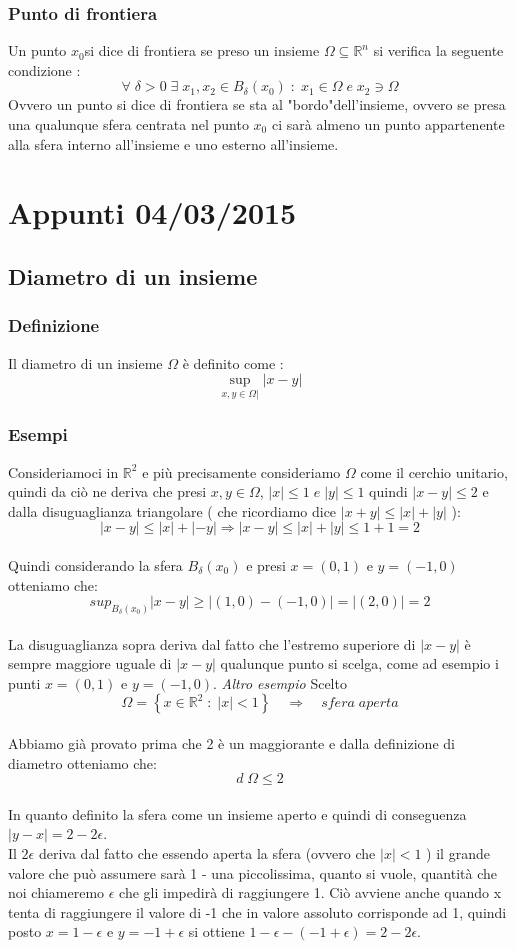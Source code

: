 \documentclass[fontsize = 20px, paper = a4]{article}
\begin{document}
\subsubsection{Punto di frontiera}
Un punto $x_0$si dice di frontiera se preso un insieme $\Omega \subseteq \mathbb{R}^n$ si verifica la seguente condizione : 
$$\forall \; \delta > 0 \; \exists \; x_1,x_2 \in B_\delta (x_0) \; : \; x_1 \in \Omega \; e \; x_2 \ni\Omega $$
Ovvero un punto si dice di frontiera se sta al "bordo"dell'insieme, ovvero se presa una qualunque sfera centrata nel punto $x_0$ ci sarà almeno un punto appartenente alla sfera interno all'insieme e uno esterno all'insieme.
\section{Appunti 04/03/2015}
\subsection{Diametro di un insieme}
\subsubsection{Definizione}
Il diametro di un insieme $\Omega$ è definito come :
$$\sup_{x,y \in \Omega|}|x-y|$$
\subsubsection{Esempi}
Consideriamoci in $\mathbb{R}^2$ e più precisamente consideriamo $\Omega$ come il cerchio unitario, quindi da ciò ne deriva che presi $x,y \in \Omega$, $|x| \le 1 \; e \; |y| \le 1$ quindi $ | x - y | \le 2$ e dalla disuguaglianza triangolare ( che ricordiamo dice $|x+y| \le |x| + |y|$ ): 
$$|x-y| \le |x| + |-y| \Longrightarrow |x-y| \le |x| + |y| \le 1 +1 = 2$$  \\ 
Quindi considerando la sfera $B_\delta(x_0)$ e presi $x = (0,1)$ e $y=(-1,0)$ otteniamo che:
$$sup_{B_\delta(x_0)} |x-y| \ge |(1,0) - (-1,0)| = |(2,0)| = 2$$ \\ 
La disuguaglianza sopra deriva dal fatto che l'estremo superiore di $|x-y|$ è sempre maggiore uguale di $|x-y|$ qualunque punto si scelga, come ad esempio i punti $x = (0,1)$ e $y = (-1,0)$.
\emph{Altro esempio}
Scelto \\
$$\Omega = \left \{ x\in \mathbb{R}^2 \; : \; |x| < 1 \right \} \quad \Longrightarrow \quad sfera \; aperta $$ \\
Abbiamo già provato prima che 2 è un maggiorante e dalla definizione di diametro otteniamo che:
$$d\;\Omega \le 2$$ \\
In quanto definito la sfera come un insieme aperto e quindi di conseguenza $|y - x| = 2 -2\epsilon$. \\
Il $2\epsilon$ deriva dal fatto che essendo aperta la sfera  (ovvero che $|x| < 1$ ) il grande valore che può assumere sarà 1 - una piccolissima, quanto si vuole, quantità che noi chiameremo $\epsilon$ che gli impedirà di raggiungere 1. Ciò avviene anche quando x tenta di raggiungere il valore di -1 che in valore assoluto corrisponde ad 1, quindi posto $x = 1-\epsilon$ e $y = -1 + \epsilon$ si ottiene $1 - \epsilon - (-1 + \epsilon) = 2 - 2\epsilon$. \\ 
\end{document}
